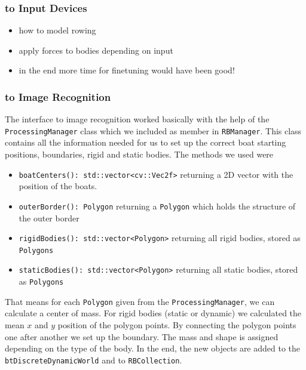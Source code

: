 \subsubsection{to Input Devices}
\begin{itemize}
\item how to model rowing
\item apply forces to bodies depending on input
\item in the end more time for finetuning would have been good!
\end{itemize}
\subsubsection{to Image Recognition}
The interface to image recognition worked basically with the help of the \texttt{ProcessingManager} class which we included as member in \texttt{RBManager}. This class contains all the information needed for us to set up the correct boat starting positions, boundaries, rigid and static bodies. The methods we used were
\begin{itemize}
\item \texttt{boatCenters(): std::vector<cv::Vec2f>} returning a 2D vector with the position of the boats.
\item \texttt{outerBorder(): Polygon} returning a \texttt{Polygon} which holds the structure of the outer border
\item \texttt{rigidBodies(): std::vector<Polygon>} returning all rigid bodies, stored as \texttt{Polygons}
\item \texttt{staticBodies(): std::vector<Polygon>} returning all static bodies, stored as \texttt{Polygons}
\end{itemize} 
That means for each \texttt{Polygon} given from the \texttt{ProcessingManager}, we can calculate a center of mass. For rigid bodies (static or dynamic) we calculated the mean $x$ and $y$ position of the polygon points. By connecting the polygon points one after another we set up the boundary. The mass and shape is assigned depending on the type of the body. In the end, the new objects are added to the \texttt{btDiscreteDynamicWorld} and to \texttt{RBCollection}.
